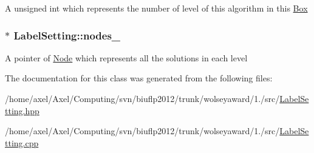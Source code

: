 \-A unsigned int which represents the number of level of this algorithm in this {\ttfamily \hyperlink{classBox}{\-Box}} \hypertarget{classLabelSetting_a41fe51e0cb4e5497bfd01194f03f90aa}{
\subsubsection[{nodes\-\_\-}]{$\ast$ {\bf \-Label\-Setting\-::nodes\-\_\-}}}\label{classLabelSetting_a41fe51e0cb4e5497bfd01194f03f90aa}
\-A pointer of {\ttfamily \hyperlink{classNode}{\-Node}} which represents all the solutions in each level 

\-The documentation for this class was generated from the following files\-:\begin{DoxyCompactItemize}
\item 
/home/axel/\-Axel/\-Computing/svn/biuflp2012/trunk/wolseyaward/1./src/\hyperlink{LabelSetting_8hpp}{\-Label\-Setting.\-hpp}\item 
/home/axel/\-Axel/\-Computing/svn/biuflp2012/trunk/wolseyaward/1./src/\hyperlink{LabelSetting_8cpp}{\-Label\-Setting.\-cpp}\end{DoxyCompactItemize}
